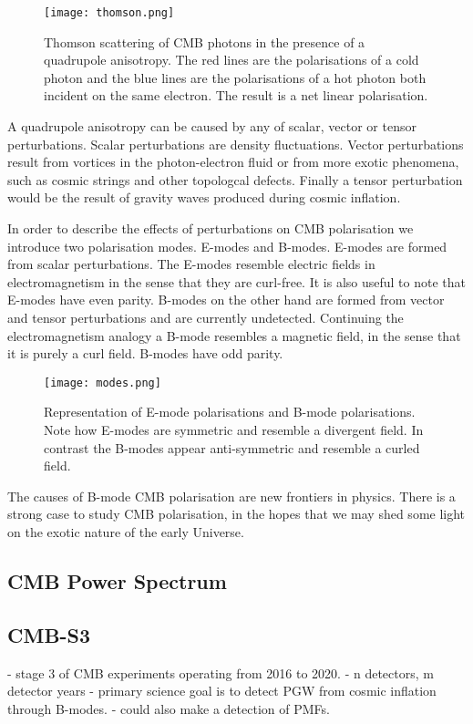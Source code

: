 \begin{figure}[h]
\centering
\texttt{[image: thomson.png]}
\caption{Thomson scattering of CMB photons in the presence of a quadrupole anisotropy. The red lines are the polarisations of a cold photon and the blue lines are the polarisations of a hot photon both incident on the same electron. The result is a net linear polarisation.}
\label{fig:thomson}
\end{figure}
\pagebreak
A quadrupole anisotropy can be caused by any of scalar, vector or tensor perturbations. Scalar perturbations are density fluctuations. Vector perturbations result from vortices in the photon-electron fluid or from more exotic phenomena, such as cosmic strings and other topologcal defects. Finally a tensor perturbation would be the result of gravity waves produced during cosmic inflation.  

In order to describe the effects of perturbations on CMB polarisation we introduce two polarisation modes. E-modes and B-modes. E-modes are formed from scalar perturbations. The E-modes resemble electric fields in electromagnetism in the sense that they are curl-free. It is also useful to note that E-modes have even parity. B-modes on the other hand are formed from vector and tensor perturbations and are currently undetected. Continuing the electromagnetism analogy a B-mode resembles a magnetic field, in the sense that it is purely a curl field. B-modes have odd parity.

\begin{SCfigure}
\centering
\texttt{[image: modes.png]}
\caption{Representation of E-mode polarisations and B-mode polarisations. Note how E-modes are symmetric and resemble a divergent field. In contrast the B-modes appear anti-symmetric and resemble a curled field.}
\label{fig:modes}
\end{SCfigure}

The causes of B-mode CMB polarisation are new frontiers in physics. There is a strong case to study CMB polarisation, in the hopes that we may shed some light on the exotic nature of the early Universe.

\subsection{CMB Power Spectrum}


	
\subsection{CMB-S3}
	- stage 3 of CMB experiments operating from 2016 to 2020.
	- n detectors, m detector years
	- primary science goal is to detect PGW from cosmic inflation through B-modes.
	- could also make a detection of PMFs.
